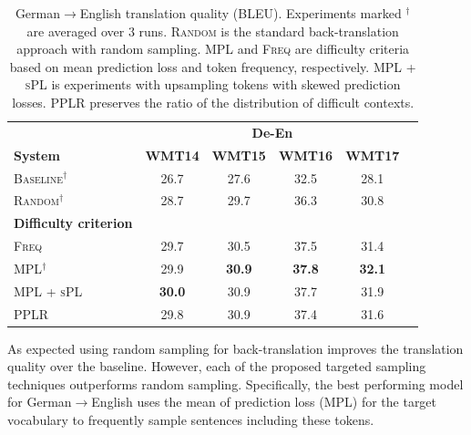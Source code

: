 \begin{table}
\begin{center}
\tabcolsep=2.5pt%
\caption{ \label{meanresultsdeen}  German$\rightarrow$English translation quality ({BLEU}). Experiments marked $^\dagger$ are averaged over 3 runs. \textsc{Random} is the standard back-translation approach with random sampling. \textsc{MPL} and \textsc{Freq} are difficulty criteria based on mean prediction loss and token frequency, respectively. \textsc{MPL + sPL} is experiments with upsampling tokens with skewed prediction losses. \textsc{PPLR} preserves the  ratio of the distribution of difficult contexts.	}
\begin{tabular}{@{ }lccccc@{}}
\toprule
   & \multicolumn{4}{c}{\textbf{De-En}}  \\ \cmidrule{2-6}
 \textbf{System}  & \bf WMT14 & \bf  WMT15 &   \bf WMT16 &   \bf WMT17 \\ 
\midrule     
 \textsc{Baseline}$^\dagger$		& 26.7 &	27.6 &	32.5& 	28.1\\
\textsc{Random}$^\dagger$ & 	28.7& 		29.7	&	36.3		&30.8 \\ \midrule
 \textbf{Difficulty criterion} & &&      \\ \midrule
\textsc{Freq} 	& 29.7&30.5	&37.5&31.4 &\\		 	
\textsc{MPL}$^\dagger$ &	29.9 &		\textbf{30.9} 		&\textbf{37.8}	&\textbf{32.1}	\\ %
\textsc{MPL + sPL} 	& 	\textbf{30.0}&		30.9		&37.7	&31.9  \\
\textsc{PPLR}	&		29.8	&30.9&37.4& 31.6  \\
\bottomrule
\end{tabular}
\end{center}
\end{table}

As expected using random sampling for back-translation improves the translation quality over the baseline.
However, each of the proposed targeted sampling techniques outperforms random sampling. 
Specifically, the best performing model for German$\rightarrow$English uses the mean of prediction loss (\textsc{MPL}) for the target vocabulary to frequently sample sentences including these tokens.

